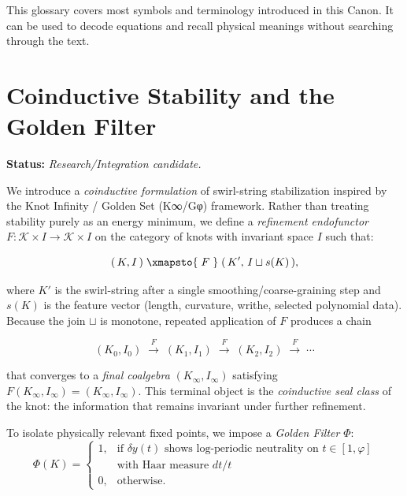 \documentclass[10pt,reprint,aps,onecolumn,nofootinbib]{revtex4-2}
\begin{document}
        This glossary covers most symbols and terminology introduced in this Canon. It can be used to decode equations and recall physical meanings without searching through the text.





    \section{Coinductive Stability and the Golden Filter}
        \label{sec:coinductive-golden}

        \noindent
        \textbf{Status:} \emph{Research/Integration candidate.}

        \medskip

        \noindent
        We introduce a \emph{coinductive formulation} of swirl-string stabilization inspired by the
        Knot Infinity / Golden Set (K∞/Gφ) framework.
        Rather than treating stability purely as an energy minimum, we define a
        \emph{refinement endofunctor}
        \(
        F: \mathcal{K}\times I \to \mathcal{K}\times I
        \)
        on the category of knots with invariant space \(I\)
        such that:

        \[
            (\,K,I\,) \;\xmapsto{\;F\;}\; (\,K',\, I \sqcup s(K)\,),
        \]

        where \(K'\) is the swirl-string after a single smoothing/coarse-graining step
        and \(s(K)\) is the feature vector (length, curvature, writhe, selected polynomial data).
        Because the join \(\sqcup\) is monotone, repeated application of \(F\)
        produces a chain

        \[
            (K_0,I_0) \;\xrightarrow{F}\; (K_1,I_1)
            \;\xrightarrow{F}\; (K_2,I_2) \;\xrightarrow{F}\; \cdots
        \]

        that converges to a \emph{final coalgebra} \((K_\infty,I_\infty)\) satisfying
        \(F(K_\infty,I_\infty)=(K_\infty,I_\infty)\).
        This terminal object is the \emph{coinductive seal class} of the knot: the information
        that remains invariant under further refinement.

        \medskip

        \noindent
        To isolate physically relevant fixed points, we impose a
        \emph{Golden Filter} \(\Phi\):
        \[
            \Phi(K) =
            \begin{cases}
                1, & \text{if } \delta y(t) \text{ shows log-periodic neutrality on } t\!\in\![1,\varphi] \\
                & \text{with Haar measure } dt/t
                \\[4pt]
                0, & \text{otherwise.}
            \end{cases}
        \]
\end{document}
